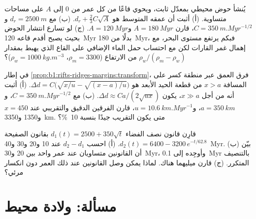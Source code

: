 \begin{exercise}[$\star\star\star$]\label{exo:b1:rifts-ridges-margins:10}
يُنشأ حوض محيطي بمعدّل ثابت، ويحوي قاعًا من كل عمر من 0 إلى $A$ على مساحات متساوية. (أ) أثبت أن عمقه المتوسط هو $d_r +
\frac23C\sqrt A$. (ب) مع $d_r = \qty{2500}{m}$ و$C = \qty{350}{m.Myr^{-1/2}}$، قارن $A = \qty{180}{Myr}$ و$A = \qty{120}{Myr}$. (ج) لو تسارع انتشار الحوض بحيث يصبح أقدم قاعه \qty{120}{Myr} بدلًا من \qty{180}{Myr}، فبكم يرتفع مستوى البحر، مع إهمال غمر القارات لكن مع احتساب حمل الماء الإضافي على القاع الذي يهبط بمقدار $\rho_w/(\rho_m - \rho_w)$ من الارتفاع ($\rho_m = 3300$، $\rho_w = \qty{1000}{kg.m^{-3}}$)؟
\end{exercise}

\begin{exercise}[$\star\star\star$]\label{exo:b1:rifts-ridges-margins:11}
في إطار \cref{prop:b1:rifts-ridges-margins:transform}، فرق العمق عبر منطقة كسر على المسافة $x > a$ من قطعة الحيد الأبعد هو $\Delta d = C\bigl(\sqrt{x/u} - \sqrt{(x - a)/u}\bigr)$. (أ) أثبت أنه من أجل $x \gg a$، يكون $\Delta d \approx Ca/(2\sqrt{ux})$. (ب) مع $C = \qty{350}{m.Myr^{-1/2}}$، و$a = \qty{350}{km}$، و$u = \qty{10.6}{km.Myr^{-1}}$، قارن الفرقين الدقيق والتقريبي عند $x = 450$ و\num{1350} و\qty{3350}{km}. متى يكون التقريب جيدًا بنسبة \qty{10}{\percent}؟
\end{exercise}

\begin{exercise}[$\star\star\star$]\label{exo:b1:rifts-ridges-margins:12}
قارِن قانون نصف الفضاء $d_1(t) = 2500 + 350\sqrt t$ بقانون الصفيحة $d_2(t) = 6400 - 3200\,e^{-t/62.8}$. (أ) احسب $d_2 - d_1$ عند 10 و\num{20} و\num{30} و\qty{40}{Myr}. (ب) بيّن أن القانونين متساويان عند عمر واحد بين 20 و\qty{30}{Myr}، وأوجِده إلى \qty{0.1}{Myr} بالتنصيف المتكرر. (ج) قارن ميليهما هناك. لماذا يمكن وصل القانونين عند ذلك العمر دون انكسار مرئي؟
\end{exercise}

\section{مسألة: ولادة محيط}

